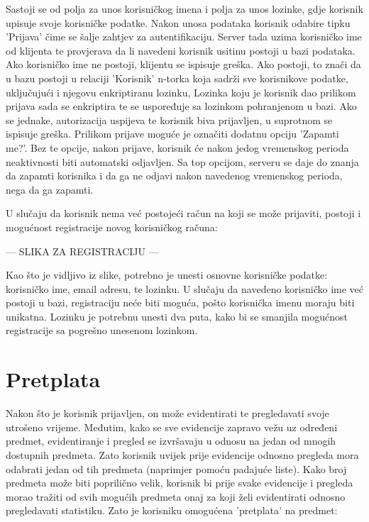 \documentclass[times, utf8, zavrsni]{fer}
\begin{document}
Sastoji se od polja za unos korisničkog imena i polja za unos lozinke, gdje korisnik upisuje svoje korisničke podatke. Nakon unosa podataka korisnik odabire tipku 'Prijava' čime se šalje zahtjev za autentifikaciju. Server tada uzima korisničko ime od klijenta te provjerava da li navedeni korisnik usitinu postoji u bazi podataka. Ako korisničko ime ne postoji, klijentu se ispisuje greška. Ako postoji, to znači da u bazu postoji u relaciji 'Korisnik' n-torka koja sadrži sve korisnikove podatke, uključujući i njegovu enkriptiranu lozinku, Lozinka koju je korisnik dao prilikom prijava sada se enkriptira te se uspoređuje sa lozinkom pohranjenom u bazi. Ako se jednake, autorizacija uspijeva te korisnik biva prijavljen, u suprotnom se ispisuje greška. 
Prilikom prijave moguće je označiti dodatnu opciju 'Zapamti me?'. Bez te opcije, nakon prijave, korisnik će nakon jedog vremenskog perioda neaktivnosti biti automatski odjavljen. Sa top opcijom, serveru se daje do znanja da zapamti korisnika i da ga ne odjavi nakon navedenog vremenskog perioda, nega da ga zapamti.

U slučaju da korisnik nema već postojeći račun na koji se može prijaviti, postoji i mogućnost registracije novog korisničkog računa:

--- SLIKA ZA REGISTRACIJU ---

Kao što je vidljivo iz slike, potrebno je unesti osnovne korisničke podatke: korisničko ime, email adresu, te lozinku. U slučaju da navedeno korisničko ime već postoji u bazi, registraciju neće biti moguća, pošto korisnička imenu moraju biti unikatna. Lozinku je potrebnu unesti dva puta, kako bi se smanjila mogućnost registracije sa pogrešno unesenom lozinkom.

\section{Pretplata}
Nakon što je korisnik prijavljen, on može evidentirati te pregledavati svoje utrošeno vrijeme. Međutim, kako se sve evidencije zapravo vežu uz određeni predmet, evidentiranje i pregled se izvršavaju u odnosu na jedan od mnogih dostupnih predmeta. Zato korisnik uvijek prije evidencije odnosno pregleda mora odabrati jedan od tih predmeta (naprimjer pomoću padajuće liste). Kako broj predmeta može biti poprilično velik, korisnik bi prije svake evidencije i pregleda morao tražiti od svih mogućih predmeta onaj za koji želi evidentirati odnosno pregledavati statistiku. Zato je korisniku omogućena 'pretplata' na predmet:
\end{document}

